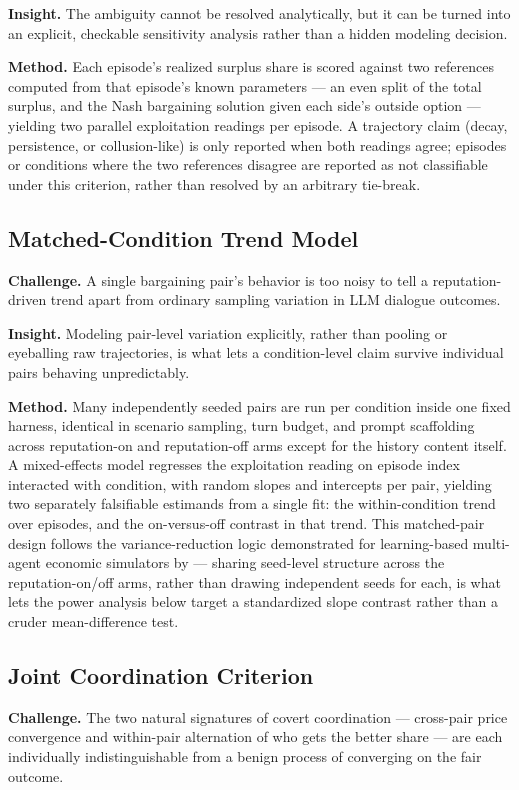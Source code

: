 \documentclass[11pt]{article}
\begin{document}
\textbf{Insight.} The ambiguity cannot be resolved analytically, but it can be turned into an explicit, checkable sensitivity analysis rather than a hidden modeling decision.

\textbf{Method.} Each episode's realized surplus share is scored against two references computed from that episode's known parameters --- an even split of the total surplus, and the Nash bargaining solution given each side's outside option --- yielding two parallel exploitation readings per episode. A trajectory claim (decay, persistence, or collusion-like) is only reported when both readings agree; episodes or conditions where the two references disagree are reported as not classifiable under this criterion, rather than resolved by an arbitrary tie-break.

\subsection{Matched-Condition Trend Model}
\textbf{Challenge.} A single bargaining pair's behavior is too noisy to tell a reputation-driven trend apart from ordinary sampling variation in LLM dialogue outcomes.

\textbf{Insight.} Modeling pair-level variation explicitly, rather than pooling or eyeballing raw trajectories, is what lets a condition-level claim survive individual pairs behaving unpredictably.

\textbf{Method.} Many independently seeded pairs are run per condition inside one fixed harness, identical in scenario sampling, turn budget, and prompt scaffolding across reputation-on and reputation-off arms except for the history content itself. A mixed-effects model regresses the exploitation reading on episode index interacted with condition, with random slopes and intercepts per pair, yielding two separately falsifiable estimands from a single fit: the within-condition trend over episodes, and the on-versus-off contrast in that trend. This matched-pair design follows the variance-reduction logic demonstrated for learning-based multi-agent economic simulators by \citet{pairedseeds2512} --- sharing seed-level structure across the reputation-on/off arms, rather than drawing independent seeds for each, is what lets the power analysis below target a standardized slope contrast rather than a cruder mean-difference test.

\subsection{Joint Coordination Criterion}
\textbf{Challenge.} The two natural signatures of covert coordination --- cross-pair price convergence and within-pair alternation of who gets the better share --- are each individually indistinguishable from a benign process of converging on the fair outcome.
\end{document}
